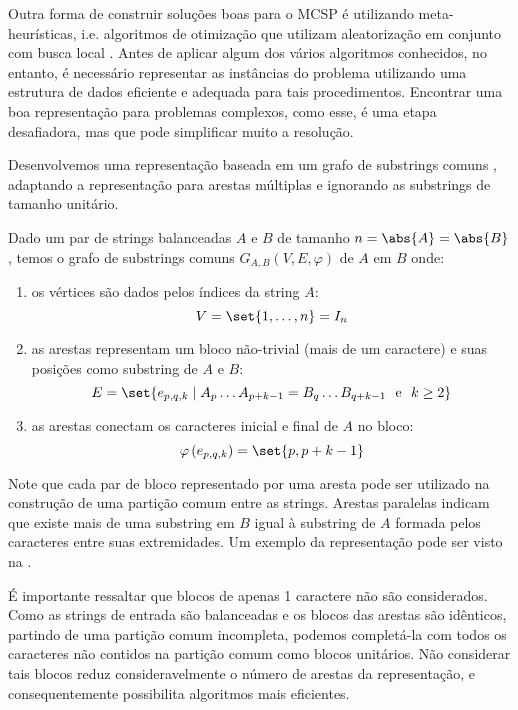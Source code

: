 Outra forma de construir soluções boas para o MCSP é utilizando meta-heurísticas, i.e. algoritmos de otimização que utilizam aleatorização em conjunto com busca local \cite[p.~4]{yang_nature-inspired_2010}. Antes de aplicar algum dos vários algoritmos conhecidos, no entanto, é necessário representar as instâncias do problema utilizando uma estrutura de dados eficiente e adequada para tais procedimentos. Encontrar uma boa representação para problemas complexos, como esse, é uma etapa desafiadora, mas que pode simplificar muito a resolução.

Desenvolvemos uma representação baseada em um grafo de substrings comuns \cite{ferdous_solving_2017}, adaptando a representação para arestas múltiplas e ignorando as substrings de tamanho unitário.

\begin{definition}
    Dado um par de strings balanceadas $A$ e $B$ de tamanho $n = \abs{A} = \abs{B}$, temos o grafo de substrings comuns $G_{A,B}(V,E,\varphi)$ de $A$ em $B$ onde:

    \begin{enumerate}[
        label = {\alph*)},
        ref = \thedefinition.\alph*,
        parsep = 0pt,
        itemsep = 0.2em,
        topsep = 0pt
    ]
        \item os vértices são dados pelos índices da string $A$: \[
            V = \set{1, \ldots, n} = I_n
        \]

        \item as arestas representam um bloco não-trivial (mais de um caractere) e suas posições como substring de $A$ e $B$: \[
            E = \set{e_{p, q, k} \mid A_p \ldots A_{p + k - 1} = B_q \ldots B_{q + k - 1} ~\text{ e }~ k \geq 2}
        \]

        \item as arestas conectam os caracteres inicial e final de $A$ no bloco: \[
            \varphi\left(e_{p, q, k}\right) = \set{p, p + k - 1}
        \]
    \end{enumerate}
\end{definition}

Note que cada par de bloco representado por uma aresta pode ser utilizado na construção de uma partição comum entre as strings. Arestas paralelas indicam que existe mais de uma substring em $B$ igual à substring de $A$ formada pelos caracteres entre suas extremidades. Um exemplo da representação pode ser visto na .

É importante ressaltar que blocos de apenas 1 caractere não são considerados. Como as strings de entrada são balanceadas e os blocos das arestas são idênticos, partindo de uma partição comum incompleta, podemos completá-la com todos os caracteres não contidos na partição comum como blocos unitários. Não considerar tais blocos reduz consideravelmente o número de arestas da representação, e consequentemente possibilita algoritmos mais eficientes.

